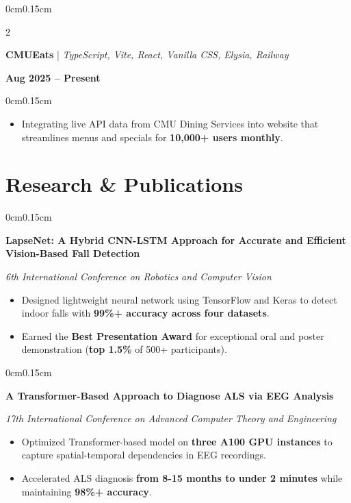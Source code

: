 \documentclass[10pt, letterpaper]{article}
\newenvironment{highlights}{
    \begin{itemize}[topsep=0pt, parsep=0pt, partopsep=0pt, itemsep=0pt, leftmargin=0.6cm]
}{
    \end{itemize}
}
\newenvironment{onecolentry}{
    \begin{adjustwidth}{0cm}{0.15cm}
}{
    \end{adjustwidth}
}
\newenvironment{twocolentry}[2][]{
    \onecolentry
    \def\secondColumn{#2}
    \setcolumnwidth{\fill, 4cm}
    \begin{paracol}{2}
}{
    \switchcolumn \raggedleft \secondColumn
    \end{paracol}
    \endonecolentry
}
\begin{document}
    \vspace{0.05cm}

    \begin{twocolentry}{\textbf{Aug 2025 -- Present}}
        \textbf{CMUEats} | \textit{TypeScript, Vite, React, Vanilla CSS, Elysia, Railway}
    \end{twocolentry}
    \vspace{-0.1cm}
    \begin{onecolentry}
        \begin{highlights}
            \item Integrating live API data from CMU Dining Services into website that streamlines menus and specials for \textbf{10,000+ users monthly}.
        \end{highlights}
    \end{onecolentry}

    \vspace{0.05cm}
    \section{Research \& Publications}
    \vspace{0.1cm}

    \begin{onecolentry}
        \textbf{LapseNet: A Hybrid CNN-LSTM Approach for Accurate and Efficient Vision-Based Fall Detection}
        
        \textit{6th International Conference on Robotics and Computer Vision}
        \begin{highlights}
            \item Designed lightweight neural network using TensorFlow and Keras to detect indoor falls with \textbf{99\%+ accuracy across four datasets}.
            \item Earned the \textbf{Best Presentation Award} for exceptional oral and poster demonstration (\textbf{top 1.5\%} of 500+ participants).
        \end{highlights}
    \end{onecolentry}

    \vspace{0.05cm}

    \begin{onecolentry}
        \textbf{A Transformer-Based Approach to Diagnose ALS via EEG Analysis}
        
        \textit{17th International Conference on Advanced Computer Theory and Engineering}
        \begin{highlights}
            \item Optimized Transformer-based model on \textbf{three A100 GPU instances} to capture spatial-temporal dependencies in EEG recordings.
            \item Accelerated ALS diagnosis \textbf{from 8-15 months to under 2 minutes} while maintaining \textbf{98\%+ accuracy}.
        \end{highlights}
    \end{onecolentry}
\end{document}
